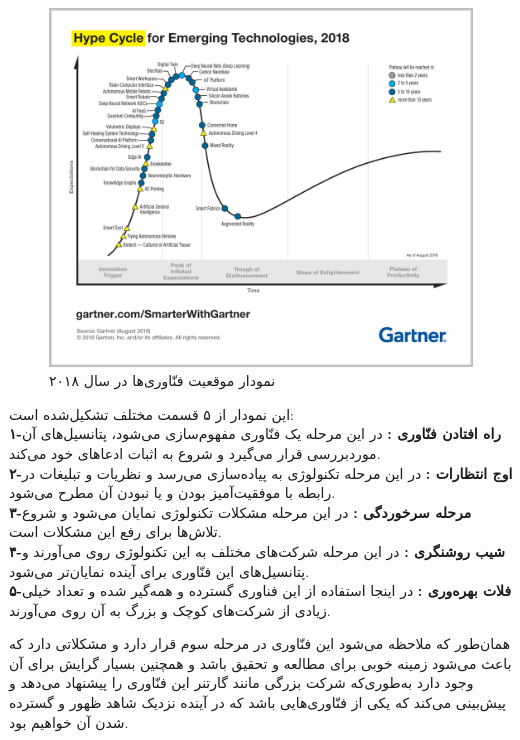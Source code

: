 \begin{figure}[tb]
	\centering
	\includegraphics[width=1\linewidth]{image/gartner}
	\caption {نمودار موقعیت فنّاوری‌ها در سال ۲۰۱۸}
	\label{fig:gartner}
\end{figure}
\noindent
این نمودار از ۵ قسمت مختلف تشکیل‌شده است: 
\\
\textbf{
	۱-راه افتادن فنّاوری  : }در این مرحله یک فنّاوری مفهوم‌سازی می‌شود، پتانسیل‌های آن موردبررسی قرار می‌گیرد و شروع به اثبات ادعاهای خود می‌کند.
\\
\textbf{
	۲-اوج انتظارات  : }در این مرحله تکنولوژی به پیاده‌سازی می‌رسد و نظریات و تبلیغات در رابطه با موفقیت‌آمیز بودن و یا نبودن آن مطرح می‌شود.
\\
\textbf{
	۳-مرحله سرخوردگی  :} در این مرحله مشکلات تکنولوژی نمایان می‌شود و شروع تلاش‌ها برای رفع این مشکلات است.
\\
\textbf{
	۴-شیب روشنگری  :} در این مرحله شرکت‌های مختلف به این تکنولوژی روی می‌آورند و پتانسیل‌های این فنّاوری برای آینده نمایان‌تر می‌شود.
\\
\textbf{
	۵-فلات بهره‌وری  :} در اینجا استفاده از این فناوری گسترده و همه‌گیر شده و تعداد خیلی زیادی از شرکت‌های کوچک و بزرگ به آن روی می‌آورند.

همان‌طور که ملاحظه می‌شود این فنّاوری در مرحله سوم قرار دارد و مشکلاتی دارد که باعث می‌شود زمینه خوبی برای مطالعه و تحقیق باشد و همچنین بسیار گرایش برای آن وجود دارد به‌طوری‌که شرکت بزرگی مانند گارتنر این فنّاوری را پیشنهاد می‌دهد و پیش‌بینی می‌کند که یکی از فنّاوری‌هایی باشد که در آینده نزدیک شاهد ظهور و گسترده شدن آن خواهیم بود.

